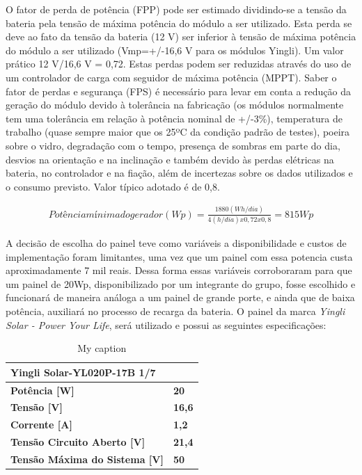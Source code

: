         O fator de perda de potência (FPP) pode ser estimado dividindo-se a tensão da bateria pela tensão de máxima potência do módulo a ser utilizado. Esta perda se deve ao fato da tensão da bateria (12 V) ser inferior à tensão de máxima potência do módulo a ser utilizado (Vmp=+/-16,6 V para os módulos Yingli). Um valor prático 12 V/16,6 V = 0,72. Estas perdas podem ser reduzidas através do uso de um controlador de carga com seguidor de máxima potência (MPPT).
        Saber o fator de perdas e segurança (FPS) é necessário para levar em conta a redução da geração do módulo devido à tolerância na fabricação (os módulos normalmente tem uma tolerância em relação à potência nominal de +/-3\%), temperatura de trabalho (quase sempre maior que os 25ºC da condição padrão de testes), poeira sobre o vidro, degradação com o tempo, presença de sombras em parte do dia, desvios na orientação e na inclinação e também devido às perdas elétricas na bateria, no controlador e na fiação, além de incertezas sobre os dados utilizados e o consumo previsto. Valor típico adotado é de 0,8.

\begin{eqnarray}
Potência mínima do gerador (Wp) = \frac{\text{1880}(Wh/dia) }{\text{4} (h/dia) x 0,72 x 0,8} = 815 Wp
\end{eqnarray}

        A decisão de escolha do painel teve como variáveis a disponibilidade e custos de implementação foram limitantes, uma vez que um painel com essa potencia custa aproximadamente 7 mil reais. Dessa forma essas variáveis corroboraram para que um painel de 20Wp, disponibilizado por um integrante do grupo, fosse escolhido e funcionará de maneira análoga a um painel de grande porte, e ainda que de baixa potência,  auxiliará no processo de recarga da bateria.
        O painel da marca \textit{Yingli Solar - Power Your Life},  será utilizado e possui as seguintes especificações:

\begin{table}[]
\centering
\caption{My caption}
\label{my-label}
\begin{tabular}{|l|l}
\cline{1-1}
\textbf{Yingli Solar-YL020P-17B 1/7} &                                    \\ \hline
\textbf{Potência {[}W{]}}                                                           & \multicolumn{1}{l|}{\textbf{20}}   \\ \hline
\textbf{Tensão {[}V{]}}                                                             & \multicolumn{1}{l|}{\textbf{16,6}} \\ \hline
\textbf{Corrente {[}A{]}}                                                           & \multicolumn{1}{l|}{\textbf{1,2}}  \\ \hline
\textbf{Tensão Circuito Aberto {[}V{]}}                                             & \multicolumn{1}{l|}{\textbf{21,4}} \\ \hline
\textbf{Tensão Máxima do Sistema {[}V{]}}                                           & \multicolumn{1}{l|}{\textbf{50}}   \\ \hline
\end{tabular}
\end{table}

